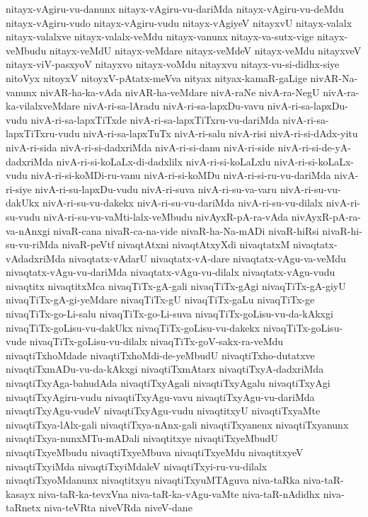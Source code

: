 {nitayx-vAgiru-vu-danunx
nitayx-vAgiru-vu-dariMda
nitayx-vAgiru-vu-deMdu
nitayx-vAgiru-vudo
nitayx-vAgiru-vudu
nitayx-vAgiyeV
nitayxvU
nitayx-valalx
nitayx-valalxve
nitayx-valalx-veMdu
nitayx-vanunx
nitayx-va-sutx-vige
nitayx-veMbudu
nitayx-veMdU
nitayx-veMdare
nitayx-veMdeV
nitayx-veMdu
nitayxveV
nitayx-viV-pasxyoV
nitayxvo
nitayx-voMdu
nitayxvu
nitayx-vu-si-didhx-siye
nitoVyx
nitoyxV
nitoyxV-pAtatx-meVva
nityax
nityax-kamaR-gaLige
nivAR-Na-vanunx
nivAR-ha-ka-vAda
nivAR-ha-veMdare
nivA-raNe
nivA-ra-NegU
nivA-ra-ka-vilalxveMdare
nivA-ri-sa-lAradu
nivA-ri-sa-lapxDu-vavu
nivA-ri-sa-lapxDu-vudu
nivA-ri-sa-lapxTiTxde
nivA-ri-sa-lapxTiTxru-vu-dariMda
nivA-ri-sa-lapxTiTxru-vudu
nivA-ri-sa-lapxTuTx
nivA-ri-salu
nivA-risi
nivA-ri-si-dAdx-yitu
nivA-ri-sida
nivA-ri-si-dadxriMda
nivA-ri-si-danu
nivA-ri-side
nivA-ri-si-de-yA-dadxriMda
nivA-ri-si-koLaLx-di-dadxlilx
nivA-ri-si-koLaLxlu
nivA-ri-si-koLaLx-vudu
nivA-ri-si-koMDi-ru-vanu
nivA-ri-si-koMDu
nivA-ri-si-ru-vu-dariMda
nivA-ri-siye
nivA-ri-su-lapxDu-vudu
nivA-ri-suva
nivA-ri-su-va-varu
nivA-ri-su-vu-dakUkx
nivA-ri-su-vu-dakekx
nivA-ri-su-vu-dariMda
nivA-ri-su-vu-dilalx
nivA-ri-su-vudu
nivA-ri-su-vu-vaMti-lalx-veMbudu
nivAyxR-pA-ra-vAda
nivAyxR-pA-ra-va-nAnxgi
nivaR-cana
nivaR-ca-na-vide
nivaR-ha-Na-mADi
nivaR-hiRsi
nivaR-hi-su-vu-riMda
nivaR-peVtf
nivaqtAtxni
nivaqtAtxyXdi
nivaqtatxM
nivaqtatx-vAdadxriMda
nivaqtatx-vAdarU
nivaqtatx-vA-dare
nivaqtatx-vAgu-va-veMdu
nivaqtatx-vAgu-vu-dariMda
nivaqtatx-vAgu-vu-dilalx
nivaqtatx-vAgu-vudu
nivaqtitx
nivaqtitxMca
nivaqTiTx-gA-gali
nivaqTiTx-gAgi
nivaqTiTx-gA-giyU
nivaqTiTx-gA-gi-yeMdare
nivaqTiTx-gU
nivaqTiTx-gaLu
nivaqTiTx-ge
nivaqTiTx-go-Li-salu
nivaqTiTx-go-Li-suva
nivaqTiTx-goLisu-vu-da-kAkxgi
nivaqTiTx-goLisu-vu-dakUkx
nivaqTiTx-goLisu-vu-dakekx
nivaqTiTx-goLisu-vude
nivaqTiTx-goLisu-vu-dilalx
nivaqTiTx-goV-sakx-ra-veMdu
nivaqtiTxhoMdade
nivaqtiTxhoMdi-de-yeMbudU
nivaqtiTxho-dutatxve
nivaqtiTxmADu-vu-da-kAkxgi
nivaqtiTxmAtarx
nivaqtiTxyA-dadxriMda
nivaqtiTxyAga-bahudAda
nivaqtiTxyAgali
nivaqtiTxyAgalu
nivaqtiTxyAgi
nivaqtiTxyAgiru-vudu
nivaqtiTxyAgu-vavu
nivaqtiTxyAgu-vu-dariMda
nivaqtiTxyAgu-vudeV
nivaqtiTxyAgu-vudu
nivaqtitxyU
nivaqtiTxyaMte
nivaqtiTxya-lAlx-gali
nivaqtiTxya-nAnx-gali
nivaqtiTxyanenx
nivaqtiTxyanunx
nivaqtiTxya-nunxMTu-mADali
nivaqtitxye
nivaqtiTxyeMbudU
nivaqtiTxyeMbudu
nivaqtiTxyeMbuva
nivaqtiTxyeMdu
nivaqtitxyeV
nivaqtiTxyiMda
nivaqtiTxyiMdaleV
nivaqtiTxyi-ru-vu-dilalx
nivaqtiTxyoMdanunx
nivaqtitxyu
nivaqtiTxyuMTAguva
niva-taRka
niva-taR-kasayx
niva-taR-ka-tevxVna
niva-taR-ka-vAgu-vaMte
niva-taR-nAdidhx
niva-taRnetx
niva-teVRta
niveVRda
niveV-dane
}
